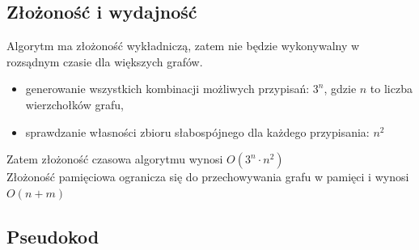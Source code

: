 \subsection{Złożoność i wydajność}

Algorytm ma złożoność wykładniczą, zatem nie będzie wykonywalny w rozsądnym czasie dla większych grafów.
\begin{itemize}
    \item generowanie wszystkich kombinacji możliwych przypisań: $3^n$, gdzie $n$ to liczba wierzchołków grafu,
    \item sprawdzanie własności zbioru słabospójnego dla każdego przypisania: $n^2$
\end{itemize}

Zatem złożoność czasowa algorytmu wynosi $O(3^n \cdot n^2)$\\
Złożoność pamięciowa ogranicza się do przechowywania grafu w pamięci i wynosi $O(n + m)$

\subsection{Pseudokod}

